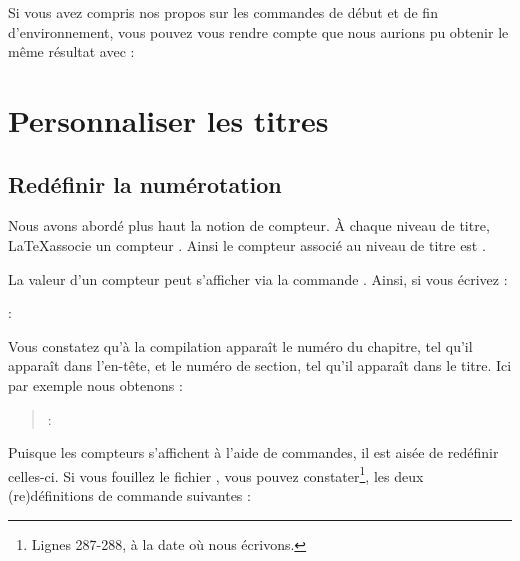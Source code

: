 \begin{plusloins}
Si vous avez compris nos propos sur les commandes de début et de fin d'environnement, vous pouvez vous rendre compte que nous aurions pu obtenir le même résultat avec :

\begin{latexcode}
\let\endoldquotation\endquotation
\renewcommand{\quotation}{\oldquotation\singlespace}
\end{latexcode}

\end{plusloins}

\section{Personnaliser les titres}

\subsection{Redéfinir la numérotation}\label{apparencecompteur}
Nous avons abordé plus haut la notion de compteur. À chaque niveau de titre, \LaTeX associe un compteur . Ainsi le compteur associé au niveau de titre  est .

La valeur d'un compteur peut s'afficher via la commande . Ainsi, si vous écrivez :
 
\begin{latexcode}
\thechapter : \thesection
\end{latexcode}

Vous constatez qu'à la compilation apparaît le numéro du chapitre, tel qu'il apparaît dans l'en-tête, et le numéro de section, tel qu'il apparaît dans le titre. Ici par exemple nous obtenons :


\begin{quotation}
\thechapter : \thesection
\end{quotation}


Puisque les compteurs s'affichent à l'aide de commandes, il est aisée de redéfinir celles-ci. Si vous fouillez le fichier , vous pouvez constater\footnote{Lignes 287-288, à la date où nous écrivons.}, les deux (re)définitions de commande suivantes :

\begin{latexcode}
\renewcommand \thechapter {\@arabic\c@chapter}
\renewcommand \thesection {\thechapter.\@arabic\c@section}
\end{latexcode}

